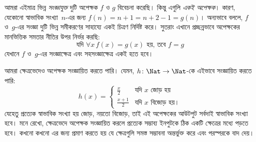 \documentclass[../../../include/open-logic-section]{subfiles}
\begin{document}
\begin{explain}
আমরা এইমাত্র ভিন্ন \emph{সংজ্ঞাযুক্ত} দুটি অপেক্ষক $f$ ও $g$ বিবেচনা করেছি। কিন্তু এগুলি \emph{একই অপেক্ষক}। কারণ, যেকোনো স্বাভাবিক সংখ্যা~$n$-এর জন্য $f(n) = n+1 = n+2-1 = g(n)$। অন্যভাবে বললে, $f$ ও~$g$-এর সংজ্ঞা দুটি ভিন্ন সমীকরণের সাহায্যে একই চিত্রণ নির্দিষ্ট করে। সুতরাং এখানে প্রচ্ছন্নভাবে অপেক্ষকের মানভিত্তিক সমতার নীতির উপর নির্ভর করছি:
\[
  \text{যদি }\forall x\, f(x) = g(x)\text{ হয়, তবে }f = g
\]
যেখানে $f$ ও~$g$-এর সংজ্ঞাক্ষেত্র এবং সহসংজ্ঞাক্ষেত্র একই হতে হবে।
\end{explain}

\begin{ex}
আমরা ক্ষেত্রভেদেও অপেক্ষক সংজ্ঞায়িত করতে পারি। যেমন, $h \colon \Nat \to \Nat$-কে এইভাবে সংজ্ঞায়িত করতে পারি:
\[
h(x) =
\begin{cases}
  \frac{x}{2} & \text{যদি $x$ জোড় হয়} \\
  \frac{x+1}{2} & \text{যদি $x$ বিজোড় হয়।}
\end{cases}
\]
যেহেতু প্রত্যেক স্বাভাবিক সংখ্যা হয় জোড়, নয়তো বিজোড়, তাই এই অপেক্ষকের আউটপুট সর্বদাই স্বাভাবিক সংখ্যা হবে। মনে রেখো, ক্ষেত্রভেদে অপেক্ষক সংজ্ঞায়িত করলে প্রত্যেক সম্ভাব্য ইনপুটকে ঠিক একটি ক্ষেত্রের মধ্যে পড়তে হবে। কখনো কখনো এর জন্য প্রমাণ করতে হয় যে ক্ষেত্রগুলি সমস্ত সম্ভাবনা অন্তর্ভুক্ত করে এবং পরস্পরকে বাদ দেয়।
\end{ex}
\end{document}
